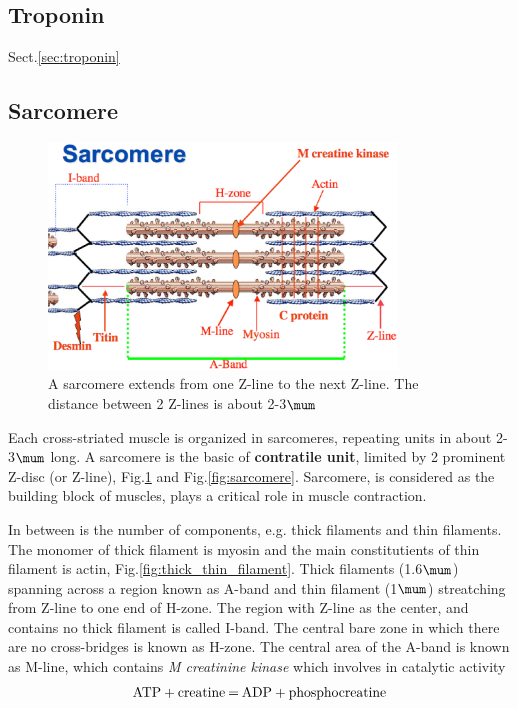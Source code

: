 \subsection{Troponin}

Sect.\ref{sec:troponin}


\subsection{Sarcomere}
\label{sec:sarcomere}
\label{sec:contractile-unit}

\begin{figure}[hbt]
  \centerline{\includegraphics[height=6cm,
    angle=0]{./images/sarcomere3.eps}}
\caption{A sarcomere extends from one Z-line to the next Z-line. The distance
between 2 Z-lines is about 2-3$\mum$}
\label{fig:sarcomere3}
\end{figure}

Each cross-striated muscle is organized in sarcomeres, repeating units in about
2-3$\mum$ long. A sarcomere is the basic of {\bf contratile unit}, limited by 2
prominent Z-disc (or Z-line), Fig.\ref{fig:sarcomere3} and
Fig.\ref{fig:sarcomere}.
Sarcomere, is considered as the building block of muscles, plays a critical
role in muscle contraction.


In between is the number of components, e.g. thick filaments and thin filaments.
The monomer of thick filament is myosin and the main constitutients of thin
filament is actin, Fig.\ref{fig:thick_thin_filament}. Thick filaments
(1.6$\mum$) spanning across a region known as A-band and thin filament (1$\mum$)
streatching from Z-line to one end of H-zone. The region with Z-line as the
center, and contains no thick filament is called I-band. The central bare zone
in which there are no cross-bridges is known as H-zone.
The central area of the A-band is known as M-line, which contains {\it M
creatinine kinase} which involves in catalytic activity
\begin{equation}
\ce{ATP + creatine = ADP + phosphocreatine}
\end{equation}


